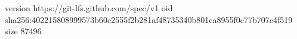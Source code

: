 version https://git-lfs.github.com/spec/v1
oid sha256:402215808999573b60c2555f2b281af48735340b801ea8955f0c77b707c4f519
size 87496

